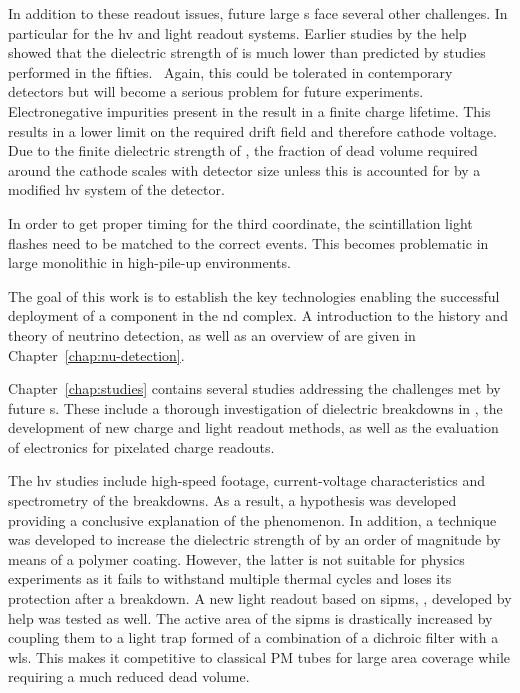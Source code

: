 In addition to these readout issues, future large \lartpc{}s face several other challenges.
In particular for the \gls{hv} and light readout systems.
Earlier studies by the \gls{help} showed that the dielectric strength of \lar{} is much lower than predicted by studies performed in the fifties.~\cite{breakdown_14, swan1, swan2}
Again, this could be tolerated in contemporary detectors but will become a serious problem for future experiments.
Electronegative impurities present in the \lar{} result in a finite charge lifetime.
This results in a lower limit on the required drift field and therefore cathode voltage.
Due to the finite dielectric strength of \lar{}, the fraction of dead volume required around the cathode scales with detector size unless this is accounted for by a modified \gls{hv} system of the detector.

In order to get proper timing for the third coordinate, the scintillation light flashes need to be matched to the correct events.
This becomes problematic in large monolithic \lartpc{} in high-pile-up environments.

The goal of this work is to establish the key technologies enabling the successful deployment of a \lartpc{} component in the \dune{} \gls{nd} complex.
A introduction to the history and theory of neutrino detection, as well as an overview of \dune{} are given in Chapter~\ref{chap:nu-detection}.

Chapter~\ref{chap:studies} contains several studies addressing the challenges met by future \lartpc{}s.
These include a thorough investigation of dielectric breakdowns in \lar{}, the development of new charge and light readout methods, as well as the evaluation of electronics for pixelated charge readouts.

The \gls{hv} studies include high-speed footage, current-voltage characteristics and spectrometry of the breakdowns.
As a result, a hypothesis was developed providing a conclusive explanation of the phenomenon.
In addition, a technique was developed to increase the dielectric strength of \lar{} by an order of magnitude by means of a polymer coating.
However, the latter is not suitable for physics experiments as it fails to withstand multiple thermal cycles and loses its protection after a breakdown.
A new light readout based on \glspl{sipm}, \AL{}, developed by \gls{help} was tested as well.
The active area of the \glspl{sipm} is drastically increased by coupling them to a light trap formed of a combination of a dichroic filter with a \gls{wls}.
This makes it competitive to classical PM tubes for large area coverage while requiring a much reduced dead volume.

